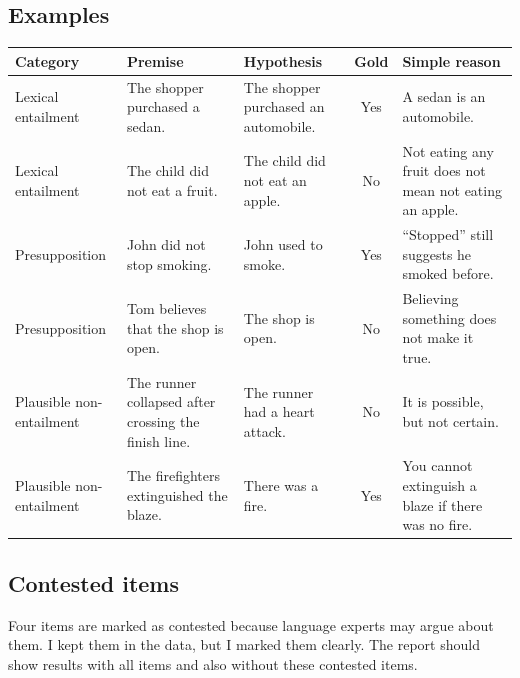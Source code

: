 \documentclass[11pt, a4paper]{article}
\begin{document}
\subsection*{\color{bambergnavy} Examples}
\begin{table}[htbp]
\centering
\small
\setlength{\tabcolsep}{5pt}
\renewcommand{\arraystretch}{1.25}
\begin{tabularx}{\textwidth}{>{\raggedright\arraybackslash}p{2.3cm} >{\raggedright\arraybackslash}p{3.4cm} >{\raggedright\arraybackslash}p{3.3cm} c >{\raggedright\arraybackslash}X}
\toprule
\rowcolor{labeltint}
\textbf{Category} & \textbf{Premise} & \textbf{Hypothesis} & \textbf{Gold} & \textbf{Simple reason} \\
\midrule
Lexical entailment & The shopper purchased a sedan. & The shopper purchased an automobile. & Yes & A sedan is an automobile. \\
\rowcolor{rowtint}
Lexical entailment & The child did not eat a fruit. & The child did not eat an apple. & No & Not eating any fruit does not mean not eating an apple. \\
Presupposition & John did not stop smoking. & John used to smoke. & Yes & ``Stopped'' still suggests he smoked before. \\
\rowcolor{rowtint}
Presupposition & Tom believes that the shop is open. & The shop is open. & No & Believing something does not make it true. \\
Plausible non-entailment & The runner collapsed after crossing the finish line. & The runner had a heart attack. & No & It is possible, but not certain. \\
\rowcolor{rowtint}
Plausible non-entailment & The firefighters extinguished the blaze. & There was a fire. & Yes & You cannot extinguish a blaze if there was no fire. \\
\bottomrule
\end{tabularx}
\end{table}

\subsection*{\color{bambergnavy} Contested items}
Four items are marked as contested because language experts may argue about them. I kept them in the data, but I marked them clearly. The report should show results with all items and also without these contested items.
\end{document}
